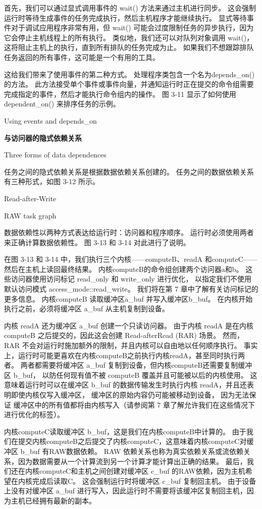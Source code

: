 首先，我们可以通过显式调用事件的 wait() 方法来通过主机进行同步。 
这会强制运行时等待生成事件的任务完成执行，然后主机程序才能继续执行。 
显式等待事件对于调试应用程序非常有用，但 wait() 可能会过度限制任务的异步执行，因为它会停止主机线程上的所有执行。 
类似地，我们还可以对队列对象调用 wait()，这将阻止主机上的执行，直到所有排队的任务完成为止。 
如果我们不想跟踪排队任务返回的所有事件，这可能是一个有用的工具。

这给我们带来了使用事件的第二种方式。 处理程序类包含一个名为depends\_on() 的方法。 
此方法接受单个事件或事件向量，并通知运行时正在提交的命令组需要完成指定的事件，然后才能执行命令组内的操作。 
图 3-11 显示了如何使用 dependent\_on() 来排序任务的示例。

{\color{red} Using events and depends\_on}

\textbf{与访问器的隐式依赖关系}

{\color{red} Three forms of data dependences}

任务之间的隐式依赖关系是根据数据依赖关系创建的。 任务之间的数据依赖关系有三种形式，如图 3-12 所示。

{\color{red} Read-after-Write}

{\color{red} RAW task graph}

数据依赖性以两种方式表达给运行时：访问器和程序顺序。 运行时必须使用两者来正确计算数据依赖性。 
图 3-13 和 3-14 对此进行了说明。

在图 3-13 和 3-14 中，我们执行三个内核——computeB、readA 和computeC——然后在主机上读回最终结果。 
内核computeB的命令组创建两个访问器a和b。 这些访问器使用访问标记 read\_only 和 write\_only 进行优化，
以指定我们不使用默认访问模式 access\_mode::read\_write。 我们将在第 7 章中了解有关访问标记的更多信息。
内核computeB 读取缓冲区a\_buf 并写入缓冲区b\_buf。 
在内核开始执行之前，必须将缓冲区 a\_buf 从主机复制到设备。

内核 readA 还为缓冲区 a\_buf 创建一个只读访问器。 
由于内核 readA 是在内核computeB 之后提交的，因此这会创建 Read-afterRead (RAR) 场景。 
然而，RAR 不会对运行时施加额外的限制，并且内核可以自由地以任何顺序执行。 
事实上，运行时可能更喜欢在内核computeB之前执行内核readA，甚至同时执行两者。 
两者都需要将缓冲区 a\_buf 复制到设备，但内核computeB还需要复制缓冲区 b\_buf，
以防任何现有值不被 computeB 覆盖并且可能被以后的内核使用。 
这意味着运行时可以在缓冲区 b\_buf 的数据传输发生时执行内核 readA，并且还表明即使内核仅写入缓冲区，
缓冲区的原始内容仍可能被移动到设备，
因为无法保证 缓冲区中的所有值都将由内核写入（请参阅第 7 章了解允许我们在这些情况下进行优化的标签）。

内核computeC读取缓冲区 b\_buf，这是我们在内核computeB中计算的。 
由于我们在提交内核computeB之后提交了内核computeC，这意味着内核computeC对缓冲区 b\_buf 有RAW数据依赖。 
RAW 依赖关系也称为真实依赖关系或流依赖关系，因为数据需要从一个计算流到另一个计算才能计算出正确的结果。 
最后，我们还在内核computeC和主机之间创建对缓冲区 c\_buf 的RAW依赖，因为主机希望在内核完成后读取C。 
这会强制运行时将缓冲区 c\_buf 复制回主机。 
由于设备上没有对缓冲区 a\_buf 进行写入，因此运行时不需要将该缓冲区复制回主机，因为主机已经拥有最新的副本。

